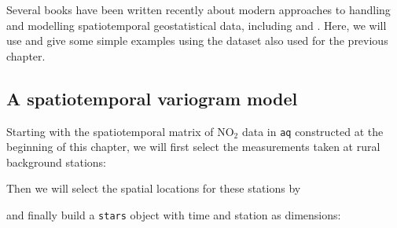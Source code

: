 \documentclass[]{book}
\newenvironment{Shaded}{\begin{snugshade}}{\end{snugshade}}
\newcommand{\DataTypeTok}[1]{\textcolor[rgb]{0.13,0.29,0.53}{#1}}
\newcommand{\KeywordTok}[1]{\textcolor[rgb]{0.13,0.29,0.53}{\textbf{#1}}}
\newcommand{\NormalTok}[1]{#1}
\newcommand{\OperatorTok}[1]{\textcolor[rgb]{0.81,0.36,0.00}{\textbf{#1}}}
\newcommand{\StringTok}[1]{\textcolor[rgb]{0.31,0.60,0.02}{#1}}
\begin{document}
Several books have been written recently about modern approaches
to handling and modelling spatiotemporal geostatistical data,
including \citep{wikle2019spatio} and \citep{blangiardo2015spatial}. Here,
we will use \citep{RJ-2016-014} and give some simple examples using the
dataset also used for the previous chapter.

\hypertarget{a-spatiotemporal-variogram-model}{%
\subsection{A spatiotemporal variogram model}\label{a-spatiotemporal-variogram-model}}

Starting with the spatiotemporal matrix of NO\(_2\) data in \texttt{aq}
constructed at the beginning of this chapter, we will first select
the measurements taken at rural background stations:

\begin{Shaded}
\end{Shaded}

Then we will select the spatial locations for these stations by

\begin{Shaded}
\end{Shaded}

and finally build a \texttt{stars} object with time and station as dimensions:

\begin{Shaded}
\end{Shaded}
\end{document}
